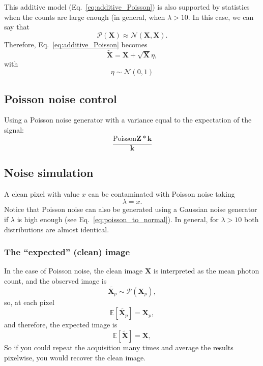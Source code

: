 This additive model (Eq.~\ref{eq:additive_Poisson}) is also supported
by statistics when the counts are large enough (in general, when
$\lambda>10$. In this case, we can say that
\begin{equation}
  \mathcal{P}(\bm{X})\approx\mathcal{N}(\bm{X},\bm{X}).
  \label{eq:poisson_normal}
\end{equation}
Therefore, Eq.~\ref{eq:additive_Poisson} becomes
\begin{equation}
  \tilde{\bm{X}} = \bm{X} + \sqrt{\bm{X}}\eta,
  \label{eq:additive_Poisson}
\end{equation}
with
\begin{equation}
  \eta\sim\mathcal{N}(0,1)
\end{equation}

\subsection{Poisson noise control}
Using a Poisson noise generator with a variance equal to the expectation
of the signal:
\begin{equation}
  \frac{\text{Poisson}{\bm{Z}*\bm{k}}}{\bm{k}}
\end{equation}

\subsection{Noise simulation}
A clean pixel with value $x$ can be contaminated with Poisson noise taking
\begin{equation}
  \lambda=x.
\end{equation}
Notice that Poisson noise can also be generated using a Gaussian noise
generator if $\lambda$ is high enough (see
Eq.~\ref{eq:poisson_to_normal}). In general, for $\lambda>10$ both
distributions are almost identical.

\subsubsection{The ``expected'' (clean) image}
In the case of Poisson noise, the clean image $\bm{X}$ is interpreted
as the mean photon count, and the observed image is
\begin{equation}
  \tilde{\bm{X}_p}\sim\mathcal{P}(\bm{X}_p),
\end{equation}
so, at each pixel
\begin{equation}
  \mathbb{E}[\tilde{\bm{X}_p}]=\bm{X}_p,
\end{equation}
and therefore, the expected image is
\begin{equation}
  \mathbb{E}[\tilde{\bm{X}}]=\bm{X},
\end{equation}
So if you could repeat the acquisition many times and average the
results pixelwise, you would recover the clean image.

